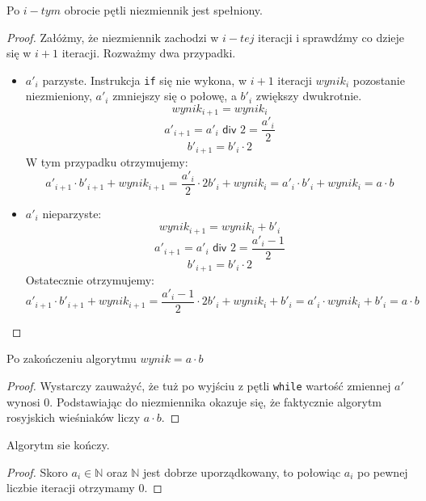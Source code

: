 \begin{lemma}
Po $i-tym$ obrocie pętli niezmiennik jest spełniony.
\end{lemma}
\begin{proof}
Załóżmy, że niezmiennik zachodzi w $i-tej$ iteracji i sprawdźmy co dzieje się w $i+1$ iteracji.
Rozważmy dwa przypadki.


\begin{itemize}
    \item $a'_i$ parzyste. Instrukcja \texttt{if} się nie wykona, w $i+1$ iteracji $wynik_i$ pozostanie niezmieniony, $a'_i$ zmniejszy się o połowę, a $b'_i$ zwiększy dwukrotnie. 
    \[
      wynik_{i+1} = wynik_i
    \]
    \[
      a'_{i+1} = a'_i \textsf{ div } 2 = \frac{a'_i}{2}
    \]
    \[
      b'_{i+1} = b'_i \cdot 2
    \]
    W tym przypadku otrzymujemy:
    \[
      a'_{i+1} \cdot b'_{i+1} + wynik_{i+1} = \frac{a'_i}{2} \cdot 2 b'_i + wynik_i = a'_i \cdot b'_i + wynik_i = a \cdot b
    \]

    \item $a'_i$ nieparzyste:
    \[
      wynik_{i+1} = wynik_i + b'_i
    \]
    \[
      a'_{i+1} = a'_i \textsf{ div } 2 = \frac{a'_i-1}{2}
    \]
    \[
      b'_{i+1} = b'_i \cdot 2
    \]
    Ostatecznie otrzymujemy:
    \[
      a'_{i+1} \cdot b'_{i+1} + wynik_{i+1} = \frac{a'_i-1}{2} \cdot 2 b'_i + wynik_i +b'_i = a'_i \cdot wynik_i + b'_i= a \cdot b
    \]

\end{itemize}

\end{proof}

\begin{lemma}
Po zakończeniu algorytmu $wynik = a \cdot b$

\end{lemma}
\begin{proof}
Wystarczy zauważyć, że tuż po wyjściu z pętli \texttt{while} wartość zmiennej $a'$ wynosi $0$.
Podstawiając do niezmiennika okazuje się, że faktycznie algorytm rosyjskich wieśniaków liczy $a \cdot b$.
\end{proof}

\begin{lemma}
Algorytm sie kończy.
\end{lemma}
\begin{proof}
Skoro $a_i \in \mathbb{N} $ oraz $\mathbb{N}$ jest dobrze uporządkowany, to połowiąc $a_i$ po pewnej liczbie iteracji otrzymamy 0.
\end{proof}

